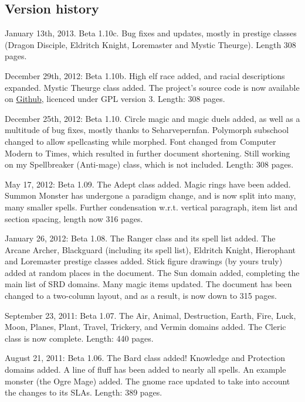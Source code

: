 \subsection{Version history}
\begin{list}{}{\leftmargin=1em}
 \item January 13th, 2013. Beta 1.10c. Bug fixes and updates, mostly in prestige classes (Dragon Disciple, Eldritch Knight, Loremaster and Mystic Theurge). Length 308 pages.
 \item December 29th, 2012: Beta 1.10b. High elf race added, and racial descriptions expanded. Mystic Theurge class added. The project's source code is now available on \href{https://github.com/Ernir/VancianToPsionics}{Github}, licenced under GPL version 3. Length: 308 pages.
 \item December 25th, 2012: Beta 1.10. Circle magic and magic duels added, as well as a multitude of bug fixes, mostly thanks to Seharvepernfan. Polymorph subschool changed to allow spellcasting while morphed. Font changed from Computer Modern to Times, which resulted in further document shortening. Still working on my Spellbreaker (Anti-mage) class, which is not included. Length: 308 pages.
 \item May 17, 2012: Beta 1.09. The Adept class added. Magic rings have been added. Summon Monster has undergone a paradigm change, and is now split into many, many smaller spells. Further condensation w.r.t. vertical paragraph, item list and section spacing, length now 316 pages.
 \item January 26, 2012: Beta 1.08. The Ranger class and its spell list added. The Arcane Archer, Blackguard (including its spell list), Eldritch Knight, Hierophant and Loremaster prestige classes added. Stick figure drawings (by yours truly) added at random places in the document. The Sun domain added, completing the main list of SRD domains. Many magic items updated. The document has been changed to a two-column layout, and as a result, is now down to 315 pages.
 \item September 23, 2011: Beta 1.07. The Air, Animal, Destruction, Earth, Fire, Luck, Moon, Planes, Plant, Travel, Trickery, and Vermin domains added. The Cleric class is now complete. Length: 440 pages.
 \item August 21, 2011: Beta 1.06. The Bard class added! Knowledge and Protection domains added. A line of fluff has been added to nearly all spells. An example monster (the Ogre Mage) added. The gnome race updated to take into account the changes to its SLAs. Length: 389 pages.

\end{list}
